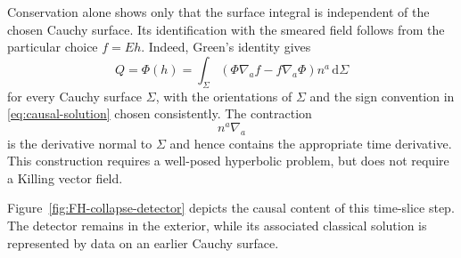 \documentclass[11pt,a4paper]{article}
\theoremstyle{definition}
\theoremstyle{remark}
\newcommand{\dd}{\mathrm d}
\begin{document}
	Conservation alone shows only that the surface integral is independent of the
	chosen Cauchy surface.  Its identification with the smeared field follows
	from the particular choice $f=Eh$.  Indeed, Green's identity gives
	\begin{equation}
		Q=\Phi(h)
		=
		\int_\Sigma
		\left(
		\Phi\nabla_a f-f\nabla_a\Phi
		\right)n^a\,\dd\Sigma
		\label{eq:symplectic-representation}
	\end{equation}
	for every Cauchy surface $\Sigma$, with the orientations of $\Sigma$ and the
	sign convention in \eqref{eq:causal-solution} chosen consistently.  The
	contraction
	\[
	n^a\nabla_a
	\]
	is the derivative normal to $\Sigma$ and hence contains the appropriate time
	derivative.  This construction requires a well-posed hyperbolic problem, but
	does not require a Killing vector field.
	
	Figure~\ref{fig:FH-collapse-detector} depicts the causal content of this
	time-slice step.  The detector remains in the exterior, while its associated
	classical solution is represented by data on an earlier Cauchy surface.
	
\end{document}
